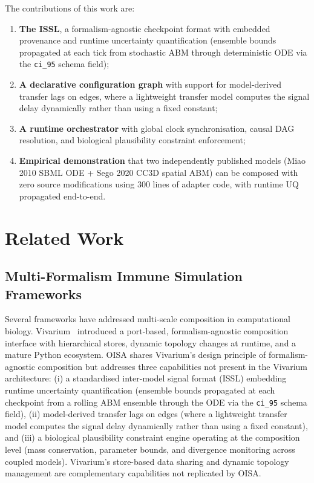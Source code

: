 \documentclass[conference,letterpaper,10pt]{IEEEtran}
\newcommand{\ttilde}{\raisebox{-0.5ex}{\textasciitilde}}
\begin{document}
\medskip\noindent The contributions of this work are:
\begin{enumerate}
  \item \textbf{The ISSL}, a formalism-agnostic checkpoint format with
        embedded provenance and runtime uncertainty quantification
        (ensemble bounds propagated at each tick from stochastic ABM
        through deterministic ODE via the \texttt{ci\_95} schema field);
  \item \textbf{A declarative configuration graph} with support for
        model-derived transfer lags on edges, where a lightweight
        transfer model computes the signal delay dynamically rather
        than using a fixed constant;
  \item \textbf{A runtime orchestrator} with global clock
        synchronisation, causal DAG resolution, and biological
        plausibility constraint enforcement;
  \item \textbf{Empirical demonstration} that two independently
        published models (Miao 2010 SBML ODE + Sego 2020 CC3D spatial
        ABM) can be composed with zero source modifications using
        \ttilde{}300 lines of adapter code, with runtime UQ propagated
        end-to-end.
\end{enumerate}

\section{Related Work}\label{sec:related}

\subsection{Multi-Formalism Immune Simulation Frameworks}
\label{sec:related-vivarium}

Several frameworks have addressed multi-scale composition in
computational biology. Vivarium~\cite{agmon2022vivarium} introduced a
port-based, formalism-agnostic composition interface with hierarchical
stores, dynamic topology changes at runtime, and a mature Python
ecosystem. OISA shares Vivarium's design principle of
formalism-agnostic composition but addresses three capabilities not
present in the Vivarium architecture: (i) a standardised inter-model
signal format (ISSL) embedding runtime uncertainty quantification
(ensemble bounds propagated at each checkpoint from a rolling ABM
ensemble through the ODE via the \texttt{ci\_95} schema field), (ii)
model-derived transfer lags on edges (where a lightweight transfer
model computes the signal delay dynamically rather than using a fixed
constant), and (iii) a biological plausibility constraint engine
operating at the composition level (mass conservation, parameter
bounds, and divergence monitoring across coupled models). Vivarium's
store-based data sharing and dynamic topology management are
complementary capabilities not replicated by OISA.
\end{document}
